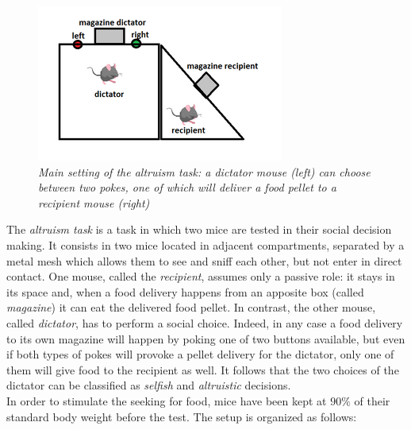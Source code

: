 \documentclass[a4paper]{article}
\begin{document}
\begin{figure}[H]
	\begin{center}
		\includegraphics[scale=1.1]{altruism.png} 
	\end{center} 
	\caption{\textit{Main setting of the altruism task: a dictator mouse (left) can choose between two pokes, one of which will deliver a food pellet to a recipient mouse (right)}}
	
\end{figure}

The \textit{altruism task} is a task in which two mice are tested in their social decision making. It consists in two mice located in adjacent compartments, separated by a metal mesh which allows them to see and sniff each other, but not enter in direct contact. One mouse, called the \textit{recipient}, assumes only a passive role: it stays in its space and, when a food delivery happens from an apposite box (called \textit{magazine}) it can eat the delivered food pellet. 
In contrast, the other mouse, called \textit{dictator}, has to perform a social choice. Indeed, in any case a food delivery to its own magazine will happen by poking one of two buttons available, but even if both types of pokes will provoke a pellet delivery for the dictator, only one of them will give food to the recipient as well. It follows that the two choices of the dictator can be classified as \textit{selfish} and \textit{altruistic} decisions.\\
In order to stimulate the seeking for food, mice have been kept at $ 90 \%$ of their standard body weight before the test. The setup is organized as follows:
\end{document}
